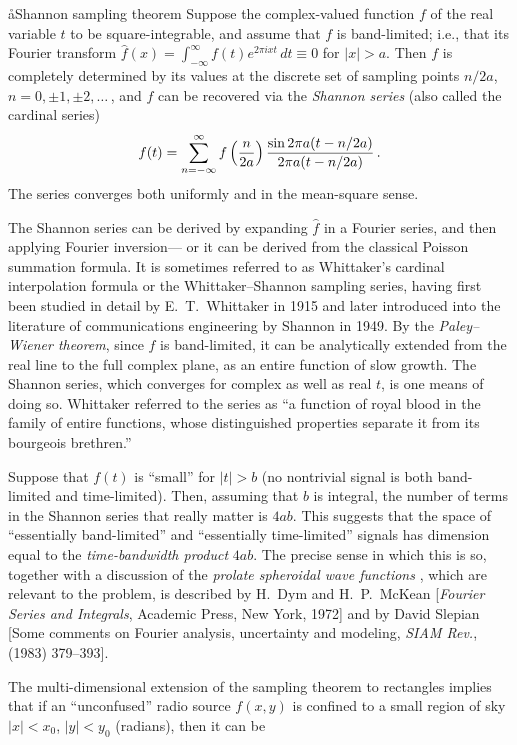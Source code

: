 \aa{Shannon sampling theorem}
Suppose the complex-valued function $f$ of the real variable $t$ to be
square-integrable, and assume that $f$ is band-limited; i.e., that its
Fourier transform
$\hat f(x)=\int_{-\infty}^\infty f(t)e^{2\pi ixt}\,dt\equiv0$ for $|x|>a$.
Then $f$ is completely determined by its values at the discrete
set of sampling points $n/2a$, $n=0,\pm1,\pm2,\ldots\,$, and $f$ can be
recovered via the {\it Shannon series} (also called the cardinal series)
$$f(t)=\sum_{n=-\infty}^{\infty}f\left(n\over2a\right)
{\sin2\pi a(t-n/2a)\over2\pi a(t-n/2a)}\,.$$
The series converges both uniformly and in the mean-square sense.
\par
The Shannon series can be derived by expanding $\hat f$ in a
Fourier series, and then applying Fourier inversion---%
or it can be derived from the classical Poisson summation formula.
It is sometimes referred to as Whittaker's cardinal interpolation formula
or the Whittaker--Shannon sampling series, having first been studied in
detail by E.~T.~Whittaker in 1915 and later introduced into the
literature of communications engineering by Shannon in 1949.
By the {\it Paley--Wiener theorem}\/, since $f$ is band-limited, it can be
analytically extended from the real line to the full complex plane,
as an entire function of slow growth.
The Shannon series, which converges for complex as well as real $t$,
is one means of doing so.
Whittaker referred to the series as ``a function of royal blood in the
family of entire functions, whose distinguished properties separate it
from its bourgeois brethren.''
\par
Suppose that $f(t)$ is ``small'' for $|t|>b$
(no nontrivial signal is both band-limited and time-limited).
Then, assuming that $b$ is integral, the number of terms in
the Shannon series that really matter is $4ab$.
This suggests that the space of ``essentially band-limited''
and ``essentially time-limited'' signals has dimension
equal to the {\sl time-bandwidth product} $4ab$.
The precise sense in which this is so, together with a discussion
of the {\it prolate spheroidal wave functions} \qv, which are relevant
to the problem, is described by H.~Dym and H.~P.~McKean
[{\it Fourier Series and Integrals}, Academic Press, New York, 1972]
and by David Slepian [Some comments on Fourier analysis, uncertainty
and modeling, {\it SIAM Rev.},  (1983) 379--393].
\par
The multi-dimensional extension of the sampling theorem to rectangles
implies that if an ``unconfused'' radio source $f(x,y)$ is confined to a
small region of sky $|x|<x_0$, $|y|<y_0$ (radians), then it can be
